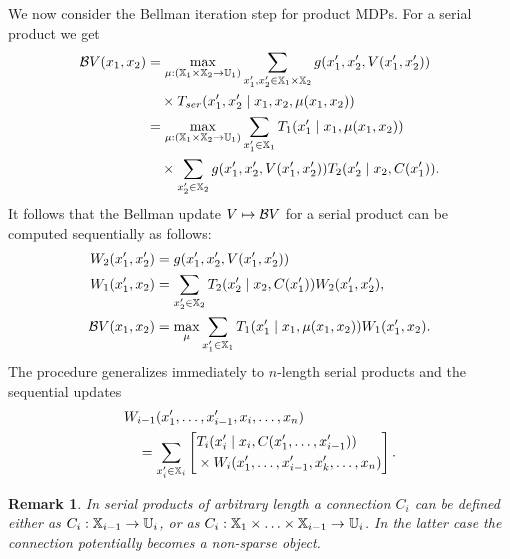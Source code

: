 \documentclass[conference]{IEEEtran}
\newtheorem{remark}{Remark}
\begin{document}
We now consider the Bellman iteration step for product MDPs. For a serial product we get
\begin{equation*}
\begin{aligned}
  \mathcal{B} V (x_1, x_2) & = \max_{\mu: (\mathbb{X}_1 \times \mathbb{X}_2 \rightarrow \mathbb{U}_1)} \sum_{x_1', x_2' \in \mathbb{X}_1 \times \mathbb{X}_2}  g(x_1', x_2', V(x_1', x_2')) \\
  & \quad \times T_{ser}(x_1', x_2' \mid x_1, x_2, \mu(x_1, x_2)) \\
  & = \max_{\mu: (\mathbb{X}_1 \times \mathbb{X}_2 \rightarrow \mathbb{U}_1)} \sum_{x_1' \in \mathbb{X}_1} T_1(x_1' \mid x_1, \mu(x_1, x_2)) \\
  & \quad \times \sum_{x_2' \in \mathbb{X}_2}  g(x_1', x_2', V(x_1', x_2')) T_2(x_2' \mid x_2, C(x_1')).
\end{aligned}
\end{equation*}
It follows that the Bellman update $V \mapsto \mathcal{B} V$ for a serial product can be computed sequentially as follows:
\begin{equation*}
\begin{aligned}
  W_2(x_1', x_2') & = g(x_1', x_2', V(x_1', x_2')) \\
  W_1(x_1', x_2) & = \sum_{x_2' \in \mathbb{X}_2}  T_2(x_2' \mid x_2, C(x_1')) W_2(x_1', x_2'), \\
  \mathcal{B} V(x_1, x_2) & = \max_{\mu} \sum_{x_1' \in \mathbb{X}_1} T_1(x_1' \mid x_1, \mu(x_1, x_2)) W_1(x_1', x_2).
\end{aligned}
\end{equation*}
The procedure generalizes immediately to $n$-length serial products and the sequential updates
\begin{equation}
\label{eq:general_decomp}
\begin{aligned}
  & W_{i-1}(x_1', \ldots, x_{i-1}', x_i, \ldots, x_n) \\
  & \quad = \sum_{x_{i}' \in \X_{i}} \left[ \begin{aligned} & T_{i} (x_{i}' \mid x_{i}, C(x_1', \ldots, x_{i-1}')) \\ 
   & \times W_{i} (x_1', \ldots, x_{i-1}', x_k', \ldots, x_n)
    \end{aligned} \right].
\end{aligned}
\end{equation}

\begin{remark}
  In serial products of arbitrary length a connection $C_i$ can be defined either as $C_i: \mathbb{X}_{i-1} \rightarrow \mathbb{U}_i$, or as $C_i: \mathbb{X}_1 \times \ldots \times \mathbb{X}_{i-1} \rightarrow \mathbb{U}_i$. In the latter case the connection potentially becomes a non-sparse object.
\end{remark}
\end{document}
